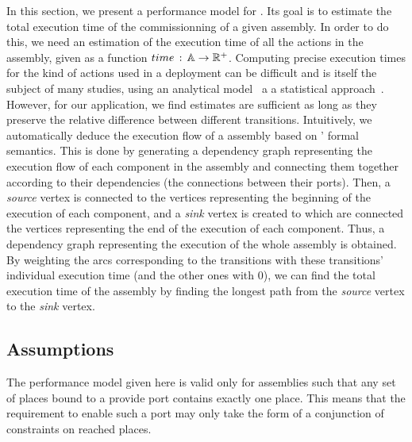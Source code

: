 In this section, we present a performance model for \mad. Its goal is to
estimate the total execution time of the commissionning of a
given assembly. In order to do this, we need an estimation of the
execution time of all the actions in the assembly, given as a
function $time\,:\,\mathbb{A}\rightarrow\mathbb{R}^+$.  Computing
precise execution times for the kind of actions used in a deployment
can be difficult and is itself the subject of many studies, \eg using
an analytical model~\cite{todo} a a statistical approach~\cite{todo}.
However, for our application, we find estimates are sufficient as long as
they preserve the relative difference between different transitions.
%
Intuitively, we automatically deduce the execution flow of a \mad
assembly based on \mad' formal semantics. This is done by generating a
dependency graph representing the execution flow of each \mad
component in the assembly and connecting them together according to their
dependencies (the connections between their ports). Then, a
\emph{source} vertex is connected to the vertices representing the beginning of
the execution of each component, and a \emph{sink} vertex is created to which
are connected the vertices representing the end of the execution of each
component.
%
Thus, a dependency graph representing the execution of the whole
assembly is obtained. By weighting the arcs corresponding to the transitions with
these transitions' individual execution time (and the other ones with 0),
we can find the total execution time of the assembly by finding the longest
path from the \emph{source} vertex to the \emph{sink} vertex.



\subsection{Assumptions}

The performance model given here is valid only for assemblies such
that any set of places bound to a provide port contains exactly one
place. This means that the requirement to enable such a port may only
take the form of a conjunction of constraints on reached places.

